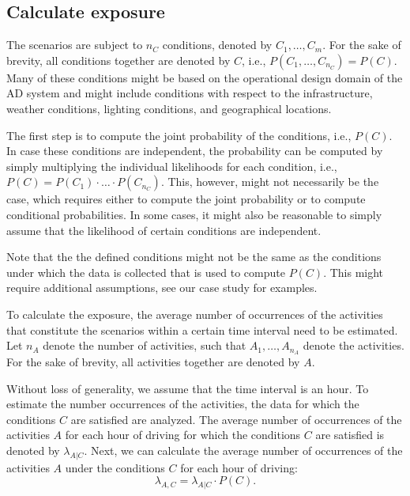 \subsection{Calculate exposure}

The scenarios are subject to $n_C$ conditions, denoted by $C_1, \ldots, C_m$. For the sake of brevity, all conditions together are denoted by $C$, i.e., $P(C_1, \ldots, C_{n_C})=P(C)$. Many of these conditions might be based on the operational design domain of the AD system and might include conditions with respect to the infrastructure, weather conditions, lighting conditions, and geographical locations. 

The first step is to compute the joint probability of the conditions, i.e., $P(C)$. In case these conditions are independent, the probability can be computed by simply multiplying the individual likelihoods for each condition, i.e., $P(C)=P(C_1)\cdot\ldots\cdot P(C_{n_C})$. This, however, might not necessarily be the case, which requires either to compute the joint probability or to compute conditional probabilities. In some cases, it might also be reasonable to simply assume that the likelihood of certain conditions are independent.

Note that the the defined conditions might not be the same as the conditions under which the data is collected that is used to compute $P(C)$. This might require additional assumptions, see our case study for examples.

To calculate the exposure, the average number of occurrences of the activities that constitute the scenarios within a certain time interval need to be estimated. Let $n_A$ denote the number of activities, such that $A_1, \ldots, A_{n_A}$ denote the activities. For the sake of brevity, all activities together are denoted by $A$. 

Without loss of generality, we assume that the time interval is an hour. To estimate the number occurrences of the activities, the data for which the conditions $C$ are satisfied are analyzed. The average number of occurrences of the activities $A$ for each hour of driving for which the conditions $C$ are satisfied is denoted by $\lambda_{A|C}$. Next, we can calculate the average number of occurrences of the activities $A$ under the conditions $C$ for each hour of driving:
\begin{equation}
	\lambda_{A,C} = \lambda_{A|C} \cdot P(C).
\end{equation}

